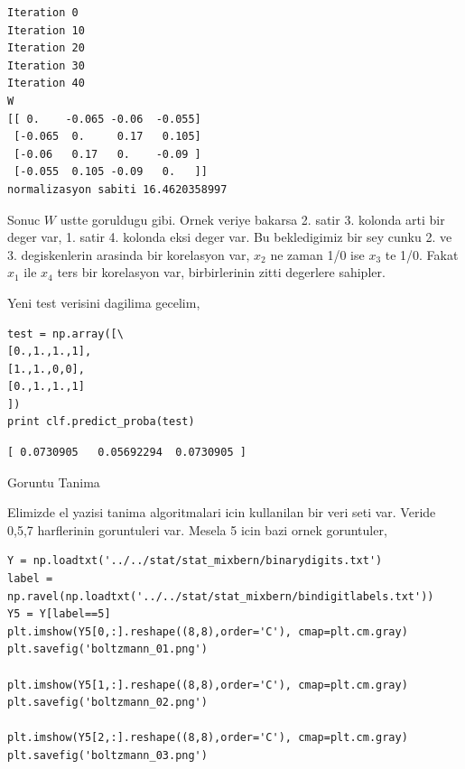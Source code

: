 \documentclass[12pt,fleqn]{article}\usepackage{../common}
\begin{document}
\begin{verbatim}
Iteration 0
Iteration 10
Iteration 20
Iteration 30
Iteration 40
W
[[ 0.    -0.065 -0.06  -0.055]
 [-0.065  0.     0.17   0.105]
 [-0.06   0.17   0.    -0.09 ]
 [-0.055  0.105 -0.09   0.   ]]
normalizasyon sabiti 16.4620358997
\end{verbatim}

Sonuc $W$ ustte goruldugu gibi. Ornek veriye bakarsa 2. satir 3. kolonda
arti bir deger var, 1. satir 4. kolonda eksi deger var. Bu bekledigimiz bir
sey cunku 2. ve 3. degiskenlerin arasinda bir korelasyon var, $x_2$ ne
zaman 1/0 ise $x_3$ te 1/0. Fakat $x_1$ ile $x_4$ ters bir korelasyon var,
birbirlerinin zitti degerlere sahipler. 

Yeni test verisini dagilima gecelim, 

\begin{verbatim}
test = np.array([\
[0.,1.,1.,1],
[1.,1.,0,0],
[0.,1.,1.,1]
])    
print clf.predict_proba(test)
\end{verbatim}

\begin{verbatim}
[ 0.0730905   0.05692294  0.0730905 ]
\end{verbatim}

Goruntu Tanima

Elimizde el yazisi tanima algoritmalari icin kullanilan bir veri seti var.
Veride 0,5,7 harflerinin goruntuleri var. Mesela 5 icin bazi ornek
goruntuler,

\begin{verbatim}
Y = np.loadtxt('../../stat/stat_mixbern/binarydigits.txt')
label = np.ravel(np.loadtxt('../../stat/stat_mixbern/bindigitlabels.txt'))
Y5 = Y[label==5]
plt.imshow(Y5[0,:].reshape((8,8),order='C'), cmap=plt.cm.gray)
plt.savefig('boltzmann_01.png')

plt.imshow(Y5[1,:].reshape((8,8),order='C'), cmap=plt.cm.gray)
plt.savefig('boltzmann_02.png')

plt.imshow(Y5[2,:].reshape((8,8),order='C'), cmap=plt.cm.gray)
plt.savefig('boltzmann_03.png')
\end{verbatim}
\end{document}

